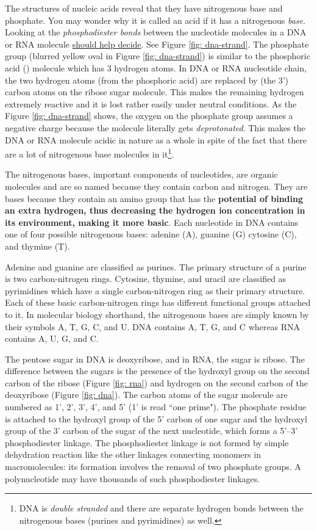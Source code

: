\documentclass[12pt]{article}
\begin{document}
The structures of nucleic acids reveal that they have nitrogenous base and phosphate. You may wonder why it is called an acid if it has a nitrogenous \emph{base}. Looking at the \emph{phosphodiester bonds} between the nucleotide molecules in a DNA or RNA molecule \href{https://biology.stackexchange.com/questions/3864/dna-as-an-acid}{should help decide}. See Figure \ref{fig: dna-strand}. The phosphate group (blurred yellow oval in Figure \ref{fig: dna-strand}) is similar to the phosphoric acid () molecule which has 3 hydrogen atoms. In DNA or RNA nucleotide chain, the two hydrogen atoms (from the phosphoric acid) are replaced by (the 3') carbon atoms on the ribose sugar molecule. This makes the remaining hydrogen extremely reactive and it is lost rather easily under neutral conditions. As the Figure \ref{fig: dna-strand} shows, the oxygen on the phosphate group assumes a negative charge because the molecule literally gets \emph{deprotonated}. This makes the DNA or RNA molecule acidic in nature as a whole in spite of the fact that there are a lot of nitrogenous base molecules in it\footnote{DNA is \emph{double stranded} and there are separate hydrogen bonds between the nitrogenous bases (purines and pyrimidines) as well.}.

The nitrogenous bases, important components of nucleotides, are organic molecules and are so named because they contain carbon and nitrogen. They are bases because they contain an amino group that has the \textbf{potential of binding an extra hydrogen, thus decreasing the hydrogen ion concentration in its environment, making it more basic}. Each nucleotide in DNA contains one of four possible nitrogenous bases: adenine (A), guanine (G) cytosine (C), and thymine (T).

Adenine and guanine are classified as purines. The primary structure of a purine is two carbon-nitrogen rings. Cytosine, thymine, and uracil are classified as pyrimidines which have a single carbon-nitrogen ring as their primary structure. Each of these basic carbon-nitrogen rings has different functional groups attached to it. In molecular biology shorthand, the nitrogenous bases are simply known by their symbols A, T, G, C, and U. DNA contains A, T, G, and C whereas RNA contains A, U, G, and C.

The pentose sugar in DNA is deoxyribose, and in RNA, the sugar is ribose. The difference between the sugars is the presence of the hydroxyl group on the second carbon of the ribose (Figure \ref{fig: rna}) and hydrogen on the second carbon of the deoxyribose (Figure \ref{fig: dna}). The carbon atoms of the sugar molecule are numbered as 1', 2', 3', 4', and 5' (1' is read ``one prime"). The phosphate residue is attached to the hydroxyl group of the 5' carbon of one sugar and the hydroxyl group of the 3' carbon of the sugar of the next nucleotide, which forms a 5'–3' phosphodiester linkage. The phosphodiester linkage is not formed by simple dehydration reaction like the other linkages connecting monomers in macromolecules: its formation involves the removal of two phosphate groups. A polynucleotide may have thousands of such phosphodiester linkages.
\end{document}
